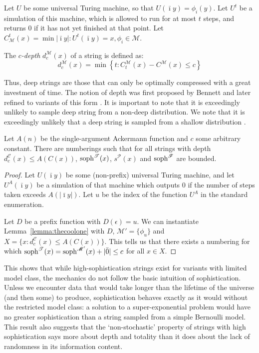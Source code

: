 \documentclass{style/llncs}
\newcommand{\M}{\mathscr M}
\newcommand{\C}{\mathscr C}
\newcommand{\T}{\mathscr T}
\newcommand{\F}{\mathscr F}
\renewcommand{\P}{\mathscr P}
\newcommand{\tn}[1]{\textnormal{#1}}
\newcommand{\s}{\tn{soph}}
\begin{document}
\begin{definition}[depth]
Let $U$ be some universal Turing machine, so that $U(\bar\imath y) = \phi_i(y)$. Let $U^t$ be a simulation of this machine, which is allowed to run for at most $t$ steps, and returns $0$ if it has not yet finished at that point. Let $C^t_\M(x) = \min{|\bar\imath y| : U^t(\bar\imath y) = x, \phi_i \in \M}$.

The \emph{$c$-depth} $d^\M_c(x)$ of a string is defined as:
\[
	d^\M_c(x) = \min \left\{t : C^\M_t(x) - C^\M(x) \leq c \right\}
\] 
\end{definition}

Thus, deep strings are those that can only be optimally compressed with a great investment of time. The notion of depth was first proposed by Bennett \cite{bennett1988logical} and later refined to variants of this form \cite{antunes2006computational}. It is important to note that it is exceedingly unlikely to sample deep string from a non-deep distribution. We note that it is exceedingly unlikely that a deep string is sampled from a shallow distribution \cite{bloem2014safe,bennett1988logical}.
 
\begin{theorem}
Let $A(n)$ be the single-argument Ackermann function and $c$ some arbitrary constant. There are numberings such that for all strings with depth $d^\C_c(x) \leq A(C(x))$, $\s^\T(x)$, $s^\P(x)$ and $\s^\F$ are bounded.
\end{theorem}
\begin{proof}
Let $U(\bar\imath y)$ be some (non-prefix) universal Turing machine, and let $U^A(\bar\imath y)$ be a simulation of that machine which outputs $0$ if the number of steps taken exceeds $A(|\bar\imath y|)$. Let $u$ be the index of the function $U^A$ in the standard enumeration.

Let $D$ be a prefix function with $D(\epsilon) = u$. We can instantiate Lemma~\ref{lemma:thecoolone} with $D$, $\M' = \{\phi_u\}$ and $X = \{x : d^\C_c(x) \leq A(C(x))\}$. This tells us that there exists a numbering for which $\s^\T(x) = \s^{\M'}(x) + |\bar0| \leq c$ for all $x \in X$.
\end{proof}

This shows that while high-sophistication strings exist for variants with limited model class, the mechanics do not follow the basic intuition of sophistication. Unless we encounter data that would take longer than the lifetime of the universe (and then some) to produce, sophistication behaves exactly as it would without the restricted model class: a solution to a super-exponential problem would have no greater sophistication than a string sampled from a simple Bernoulli model. This result also suggests that the `non-stochastic' property of strings with high sophistication\cite{shen1983concept,vereshchagin2004kolmogorov} says more about depth and totality than it does about the lack of randomness in its information content.
\end{document}
